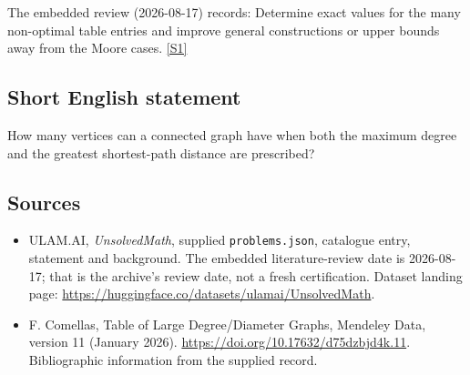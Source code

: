 \documentclass[11pt,a4paper]{article}
\newcommand{\sref}[2]{\hyperlink{source:#1:#2}{[S#2]}}
\begin{document}
The embedded review (2026-08-17) records: Determine exact values for the many non-optimal table entries and improve general constructions or upper bounds away from the Moore cases. \sref{statement}{1}

\subsection{Short English statement}

How many vertices can a connected graph have when both the maximum degree and the greatest shortest-path distance are prescribed?

\subsection{Sources}

{\small

\begin{itemize}

\item[\hypertarget{source:statement:1}{S1}] ULAM.AI, \emph{UnsolvedMath}, supplied \texttt{problems.json}, catalogue entry, statement and background. The embedded literature-review date is 2026-08-17; that is the archive’s review date, not a fresh certification. Dataset landing page: \url{https://huggingface.co/datasets/ulamai/UnsolvedMath}.

\item[\hypertarget{source:statement:2}{S2}] F. Comellas, Table of Large Degree/Diameter Graphs, Mendeley Data, version 11 (January 2026). \url{https://doi.org/10.17632/d75dzbjd4k.11}. Bibliographic information from the supplied record.

\end{itemize}

}

\label{end:statement}
\end{document}
